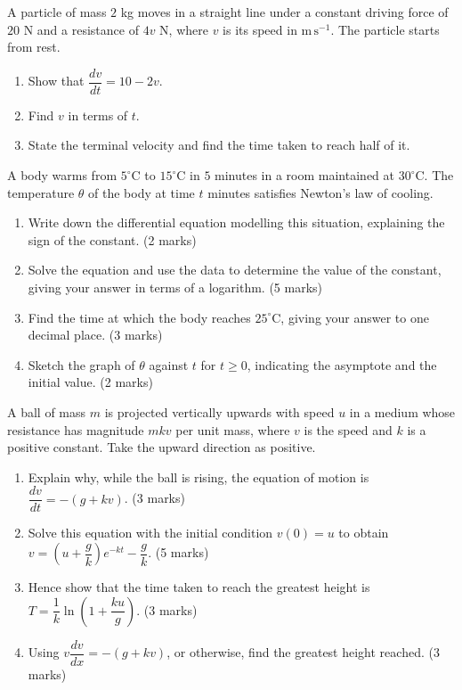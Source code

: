\documentclass[11pt]{article}
\newcounter{popsec}
\newcounter{popsub}
\newcommand{\courssub}[1]{%
  \stepcounter{popsub}%
  \par\vspace{9pt}\noindent{\popxbold\fontsize{11.5}{13}\selectfont\color{popink}{\color{poporange}\thepopsec.\thepopsub}\hspace{6pt}#1}\par\nopagebreak\vspace{4pt}
}
\begin{document}
\begin{exercice}
A particle of mass $2$ kg moves in a straight line under a constant driving force of $20$ N and a resistance of $4v$ N, where $v$ is its speed in $\mathrm{m\,s^{-1}}$. The particle starts from rest.

\begin{enumerate}
\item Show that $\dfrac{dv}{dt} = 10 - 2v$.
\item Find $v$ in terms of $t$.
\item State the terminal velocity and find the time taken to reach half of it.
\end{enumerate}
\end{exercice}

\courssub{I prepare for the GCE}

\begin{exercice}
A body warms from $5^{\circ}$C to $15^{\circ}$C in $5$ minutes in a room maintained at $30^{\circ}$C. The temperature $\theta$ of the body at time $t$ minutes satisfies Newton's law of cooling.

\begin{enumerate}
\item Write down the differential equation modelling this situation, explaining the sign of the constant. \hfill (2 marks)
\item Solve the equation and use the data to determine the value of the constant, giving your answer in terms of a logarithm. \hfill (5 marks)
\item Find the time at which the body reaches $25^{\circ}$C, giving your answer to one decimal place. \hfill (3 marks)
\item Sketch the graph of $\theta$ against $t$ for $t \geq 0$, indicating the asymptote and the initial value. \hfill (2 marks)
\end{enumerate}
\end{exercice}

\begin{exercice}
A ball of mass $m$ is projected vertically upwards with speed $u$ in a medium whose resistance has magnitude $mkv$ per unit mass, where $v$ is the speed and $k$ is a positive constant. Take the upward direction as positive.

\begin{enumerate}
\item Explain why, while the ball is rising, the equation of motion is $\dfrac{dv}{dt} = -(g + kv)$. \hfill (3 marks)
\item Solve this equation with the initial condition $v(0) = u$ to obtain $v = \left(u + \dfrac{g}{k}\right)e^{-kt} - \dfrac{g}{k}$. \hfill (5 marks)
\item Hence show that the time taken to reach the greatest height is $T = \dfrac{1}{k}\ln\left(1 + \dfrac{ku}{g}\right)$. \hfill (3 marks)
\item Using $v\dfrac{dv}{dx} = -(g + kv)$, or otherwise, find the greatest height reached. \hfill (3 marks)
\end{enumerate}
\end{exercice}
\end{document}
